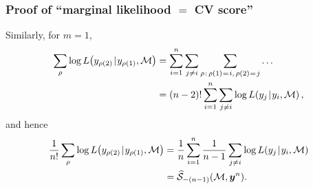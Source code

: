 \documentclass[18pt]{beamer}
\newcommand{\defineTightSpacing}{%
	\setlength{\abovedisplayskip}{.25\baselineskip}%
	\setlength{\belowdisplayskip}{.25\baselineskip}%
}
\newcommand{\given}{\thinnerspace | \thinnerspace}
\newcommand{\spacedEq}{\mkern 1mu = \mkern 1.5mu}
\newcommand{\thinnerspace}{\mskip.5\thinmuskip}
\newcommand{\likelihood}{L}
\newcommand{\by}{\bm{y}}
\newcommand{\score}{\mathcal{S}}
\newcommand{\modelSymbol}{\mathcal{M}}
\newcommand{\permutation}{\rho}
\newcommand{\testSampleIndex}{i}
\begin{document}
\begin{frame}
\frametitle{Proof of ``marginal likelihood $=$ {\large CV} score''}
Similarly, for $m = 1$,  
\begin{equation*} \defineTightSpacing%
\begin{aligned}
\sum_\permutation \log \likelihood\!\left(y_{\permutation(2)} \given y_{\permutation(1)}, \modelSymbol \right) 
	& = \sum_{\testSampleIndex = 1}^n \sum_{j \neq \testSampleIndex} \sum_{\permutation \thinnerspace : \, \permutation(1) \spacedEq i, \, \permutation(2) \spacedEq j} \ldots \\
	&= (n - 2)! \sum_{\testSampleIndex = 1}^n \sum_{j \neq \testSampleIndex} \log \likelihood\!\left(y_j \given y_\testSampleIndex, \modelSymbol \right),
\end{aligned}
\end{equation*}
and hence
\begin{equation*} \defineTightSpacing%
\begin{aligned}
\frac{1}{n!} \sum_\permutation
	 \log \likelihood\!\left(y_{\permutation(2)} \given y_{\permutation(1)}, \modelSymbol \right)
	&= \frac{1}{n} \sum_{\testSampleIndex = 1}^n \frac{1}{n - 1} \sum_{j \neq \testSampleIndex} \log \likelihood\!\left(y_j \given y_\testSampleIndex, \modelSymbol \right) \\
	&= \widehat{\score}_{-(n - 1)}(\modelSymbol, \by^n).
\end{aligned}
\end{equation*}
\end{frame}
\end{document}
